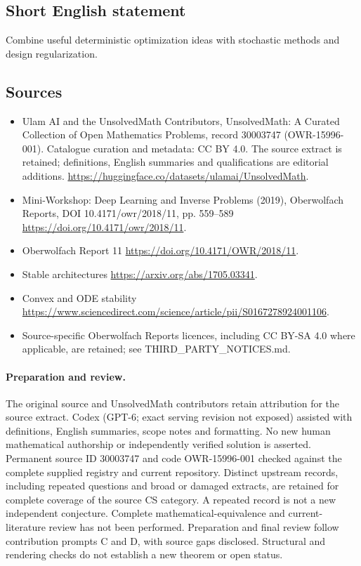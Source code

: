 \documentclass[11pt]{article}
\begin{document}
\subsection{Short English statement}
Combine useful deterministic optimization ideas with stochastic methods and design regularization.
\subsection{Sources}
\begin{itemize}
\item[\hypertarget{source:30003747:1}{S1}] Ulam AI and the UnsolvedMath Contributors, UnsolvedMath: A Curated Collection of Open Mathematics Problems, record 30003747 (OWR-15996-001). Catalogue curation and metadata: CC BY 4.0. The source extract is retained; definitions, English summaries and qualifications are editorial additions.
\url{https://huggingface.co/datasets/ulamai/UnsolvedMath}.
\item[\hypertarget{source:30003747:2}{S2}] Mini-Workshop: Deep Learning and Inverse Problems (2019), Oberwolfach Reports, DOI 10.4171/owr/2018/11, pp. 559--589
\url{https://doi.org/10.4171/owr/2018/11}.
\item[\hypertarget{source:30003747:3}{S3}] Oberwolfach Report 11
\url{https://doi.org/10.4171/OWR/2018/11}.
\item[\hypertarget{source:30003747:4}{S4}] Stable architectures
\url{https://arxiv.org/abs/1705.03341}.
\item[\hypertarget{source:30003747:5}{S5}] Convex and ODE stability
\url{https://www.sciencedirect.com/science/article/pii/S0167278924001106}.
\item Source-specific Oberwolfach Reports licences, including CC BY-SA 4.0 where applicable, are retained; see THIRD\_PARTY\_NOTICES.md.
\end{itemize}
\paragraph{Preparation and review.}
The original source and UnsolvedMath contributors retain attribution for the source extract. Codex (GPT-6; exact serving revision not exposed) assisted with definitions, English summaries, scope notes and formatting. No new human mathematical authorship or independently verified solution is asserted. Permanent source ID 30003747 and code OWR-15996-001 checked against the complete supplied registry and current repository. Distinct upstream records, including repeated questions and broad or damaged extracts, are retained for complete coverage of the source CS category. A repeated record is not a new independent conjecture. Complete mathematical-equivalence and current-literature review has not been performed. Preparation and final review follow contribution prompts C and D, with source gaps disclosed. Structural and rendering checks do not establish a new theorem or open status.
\label{end:30003747}
\end{document}
